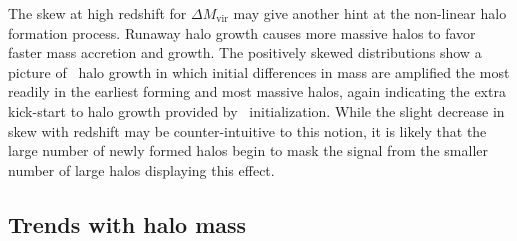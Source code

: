 The skew at high redshift for $\Delta M_{\mathrm{vir}}$ may give another hint at the non-linear halo formation process.  Runaway halo growth causes more massive halos to favor faster mass accretion and growth.  The positively skewed distributions show a picture of \lpt\ halo growth in which initial differences in mass are amplified the most readily in the earliest forming and most massive halos, again indicating the extra kick-start to halo growth provided by \lpt\ initialization.  While the slight decrease in skew with redshift may be counter-intuitive to this notion, it is likely that the large number of newly formed halos begin to mask the signal from the smaller number of large halos displaying this effect.




\subsection{Trends with halo mass}


